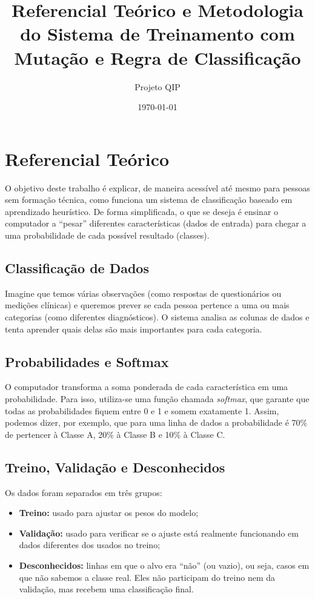 \documentclass[12pt,a4paper]{article}
\title{Referencial Teórico e Metodologia do Sistema de Treinamento com Mutação e Regra de Classificação}
\author{Projeto QIP}
\date{\today}
\begin{document}
\maketitle

\section*{Referencial Teórico}

O objetivo deste trabalho é explicar, de maneira acessível até mesmo para pessoas sem formação técnica,
como funciona um sistema de classificação baseado em aprendizado heurístico.
De forma simplificada, o que se deseja é ensinar o computador a ``pesar'' diferentes características
(dados de entrada) para chegar a uma probabilidade de cada possível resultado (classes).

\subsection*{Classificação de Dados}
Imagine que temos várias observações (como respostas de questionários ou medições clínicas) e queremos prever
se cada pessoa pertence a uma ou mais categorias (como diferentes diagnósticos). O sistema analisa as colunas
de dados e tenta aprender quais delas são mais importantes para cada categoria.

\subsection*{Probabilidades e Softmax}
O computador transforma a soma ponderada de cada característica em uma probabilidade.
Para isso, utiliza-se uma função chamada \emph{softmax}, que garante que todas as probabilidades fiquem
entre 0 e 1 e somem exatamente 1. Assim, podemos dizer, por exemplo, que para uma linha de dados a probabilidade
é 70\% de pertencer à Classe A, 20\% à Classe B e 10\% à Classe C.

\subsection*{Treino, Validação e Desconhecidos}
Os dados foram separados em três grupos:
\begin{itemize}
    \item \textbf{Treino:} usado para ajustar os pesos do modelo;
    \item \textbf{Validação:} usado para verificar se o ajuste está realmente funcionando em dados diferentes dos usados no treino;
    \item \textbf{Desconhecidos:} linhas em que o alvo era ``não'' (ou vazio), ou seja, casos em que não sabemos a classe real. Eles não participam do treino nem da validação, mas recebem uma classificação final.
\end{itemize}
\end{document}
